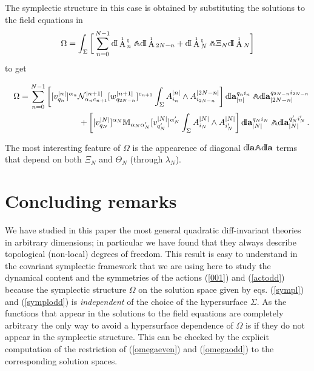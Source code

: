 \documentclass[prd,a4paper,twocolumn,amssymb,amsmath,nofootinbib,showpacs]{revtex4}
\newcommand{\dd}{\textrm{d\!I}}
\newcommand{\ww}{\wedge \kern-.75em \wedge}
\newcommand{\au}{
\begin{picture}(11,3)(-2,-2)
\put(2,5){$\scriptscriptstyle{1}$} \put(0,-3){A}
\end{picture}}
\begin{document}
The symplectic structure in this case is obtained by substituting
the solutions to the field equations in
\begin{equation}
\Omega=\int_{\Sigma}\bigg[\sum_{n=0}^{N-1}\dd\au_n^{\rm{t}}\ww\dd\au_{2N-n}+
\dd\au_N^{\rm{t}}\ww\Xi_N\dd\au_{N} \bigg] \label{omegaodd}
\end{equation}
to get
\begin{widetext}
\begin{eqnarray}
&&\Omega=\sum_{n=0}^{N-1}\left[[v_{q_n}^{|n|}]^{\alpha_n}
\mathcal{N}_{\alpha_nc_{n+1}}^{|n+1|}[w_{q_{2N-n}}^{|n+1|}]^{c_{n+1}}
\int_{\Sigma} A_{i_n}^{|n|}\wedge A_{i_{2N-n}}^{|2N-n|}\right]\dd
\mathbf{a}_{|n|}^{q_ni_n}\ww \dd
\mathbf{a}_{|2N-n|}^{q_{2N-n}i_{2N-n}} \label{symplodd}\\
&&\quad\quad\quad+\left[[v_{q_N}^{|N|}]^{\alpha_N}
\mathbb{M}_{\alpha_N\alpha^{\prime}_N}
[v_{q^{\prime}_{N}}^{|N|}]^{\alpha^{\prime}_N}
\int_{\Sigma}A_{i_N}^{|N|}\wedge
A_{i_{N}^{\prime}}^{|N|}\right]\dd \mathbf{a}_{|N|}^{q_Ni_N}\ww
\dd \mathbf{a}_{|N|}^{q_{N}^{\prime}i_{N}^{\prime}}\,.\nonumber
\end{eqnarray}
\end{widetext}
The most interesting feature of $\Omega$ is the appearence of
diagonal $\dd\mathbf{a}{\wedge\kern-.55em\wedge}\dd\mathbf{a}$
terms that depend on both $\Xi_N$ and $\Theta_N$ (through
$\lambda_N$).


\section{\label{Concl}Concluding remarks}

We have studied in this paper the most general quadratic
diff-invariant theories in arbitrary dimensions; in particular we
have found that they always describe topological (non-local)
degrees of freedom. This result is easy to understand in the
covariant symplectic framework that we are using here to study the
dynamical content and the symmetries of the actions (\ref{001})
and (\ref{actodd}) because the symplectic structure $\Omega$ on
the solution space given by eqs. (\ref{sympl}) and
(\ref{symplodd}) is \emph{independent} of the choice of the
hypersurface $\Sigma$. As the functions that appear in the
solutions to the field equations are completely arbitrary the only
way to avoid a hypersurface dependence of $\Omega$ is if they do
not appear in the symplectic structure. This can be checked by the
explicit computation of the restriction of (\ref{omegaeven}) and
(\ref{omegaodd}) to the corresponding solution spaces.
\end{document}
